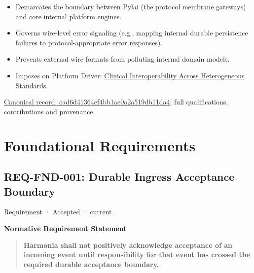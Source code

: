 \begin{itemize}


\item Demarcates the boundary between Pylai (the protocol membrane gateways) and core internal platform engines.

\item Governs wire-level error signaling (e.g., mapping internal durable persistence failures to protocol-appropriate error responses).

\item Prevents external wire formats from polluting internal domain models.

\item Imposes on Platform Driver: \href{\detokenize{../../../../../docs/markdown/01-motivation/drivers-assessments/drivers.md}}{Clinical Interoperability Across Heterogeneous Standards}.

\end{itemize}

{\footnotesize \href{../../../../continuum/motivation/constraint/cad6d41364ef4bb1ae0a2a519db11da4.md}{Canonical record: cad6d41364ef4bb1ae0a2a519db11da4}; full qualifications, contributions and provenance.}\par
\chapter{Foundational Requirements}

\section{REQ-FND-001: Durable Ingress Acceptance Boundary}

\label{element:01c834537a1e41dfb523d48f287d93e9}
{\small Requirement · Accepted · current}\par

\par\medskip\textbf{Normative Requirement Statement}\par


\begin{quote}


\textbf{Harmonia shall not positively acknowledge acceptance of an incoming event until responsibility for that event has crossed the required durable acceptance boundary.}



\end{quote}


